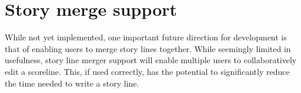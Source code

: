 \documentclass[12pt,letterpaper]{article}
\begin{document}
\section{Story merge support}

While not yet implemented, one important future direction for development is that of enabling
users to merge story lines together. While seemingly limited in usefulness, story line merger
support will enable multiple users to collaboratively edit a scoreline. This, if used correctly, has
the potential to significantly reduce the time needed to write a story line.
\end{document}
